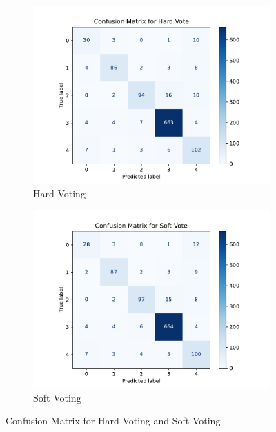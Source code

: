 \begin{figure}[t]
    \centering
    \begin{subfigure}{0.45\textwidth}
        \centering
        \includegraphics[width=\linewidth]{graphs/ModelMergeStudy/Hard Vote.pdf}
        \caption{Hard Voting}
        \label{fig: hard voting}
    \end{subfigure}
    \begin{subfigure}{0.45\textwidth}
        \centering
        \includegraphics[width=\linewidth]{graphs/ModelMergeStudy/Soft Vote.pdf}
        \caption{Soft Voting}
        \label{fig: soft voting}
    \end{subfigure}
    \caption{Confusion Matrix for Hard Voting and Soft Voting}
    \label{hard soft confusionMatrix}
\end{figure}

